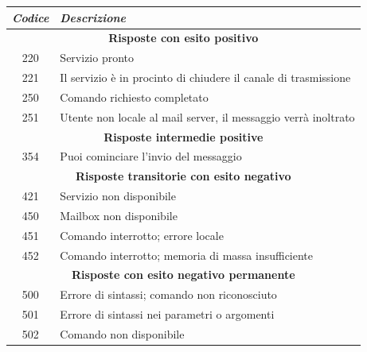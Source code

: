 \begin{table}[H]
    \centering

    \begin{tabular}{|c|p{11cm}|}
        \hline
        \emph{Codice} & \emph{Descrizione}                                              \\
        \hline
        \multicolumn{2}{|c|}{\textbf{Risposte con esito positivo}}                      \\
        \hline
        220           & Servizio pronto                                                 \\
        \hline
        221           & Il servizio è in procinto di chiudere il canale di trasmissione \\
        \hline
        250           & Comando richiesto completato                                    \\
        \hline
        251           & Utente non locale al mail server, il messaggio verrà inoltrato  \\
        \hline
        \multicolumn{2}{|c|}{\textbf{Risposte intermedie positive}}                     \\
        \hline
        354           & Puoi cominciare l'invio del messaggio                           \\
        \hline
        \multicolumn{2}{|c|}{\textbf{Risposte transitorie con esito negativo}}          \\
        \hline
        421           & Servizio non disponibile                                        \\
        \hline
        450           & Mailbox non disponibile                                         \\
        \hline
        451           & Comando interrotto; errore locale                               \\
        \hline
        452           & Comando interrotto; memoria di massa insufficiente              \\
        \hline
        \multicolumn{2}{|c|}{\textbf{Risposte con esito negativo permanente}}           \\
        \hline
        500           & Errore di sintassi; comando non riconosciuto                    \\
        \hline
        501           & Errore di sintassi nei parametri o argomenti                    \\
        \hline
        502           & Comando non disponibile                                         \\

\end{tabular}
\end{table}
